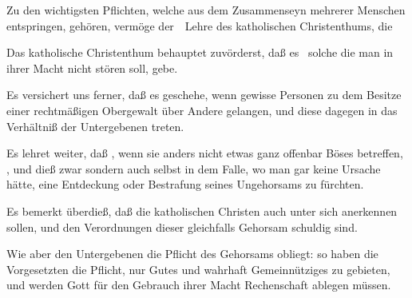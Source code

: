Zu den wichtigsten Pflichten, welche aus dem Zusammenseyn mehrerer Menschen entspringen, gehören, vermöge der~\ Lehre des katholischen Christenthums, die 
\begin{aufza}
\item Das katholische Christenthum behauptet zuvörderst, daß es  \dh\  solche  die man in ihrer Macht nicht stören soll, gebe.
\item Es versichert uns ferner, daß es  geschehe, wenn gewisse Personen zu dem Besitze einer rechtmäßigen Obergewalt über Andere gelangen, und diese dagegen in das Verhältniß der Untergebenen treten.
\item Es lehret weiter, daß , wenn sie anders nicht etwas ganz offenbar Böses betreffen, , und dieß zwar  sondern auch selbst in dem Falle, wo man gar keine Ursache hätte, eine Entdeckung oder Bestrafung seines Ungehorsams zu fürchten.
\item Es bemerkt überdieß, daß die katholischen Christen auch  unter sich anerkennen sollen, und den Verordnungen dieser gleichfalls Gehorsam schuldig sind.
\item Wie aber den Untergebenen die Pflicht des Gehorsams obliegt: so haben die Vorgesetzten die Pflicht, nur Gutes und wahrhaft Gemeinnütziges zu gebieten, und werden Gott für den Gebrauch ihrer Macht Rechenschaft ablegen müssen.
\end{aufza}
